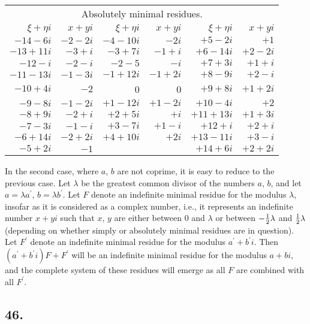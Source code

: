 \documentclass[twoside,12pt]{memoir}
\let\oldfrac\frac
\def\frac#1#2{\mathchoice{\tfrac{#1}{#2}}{\oldfrac{#1}{#2}}{\genfrac{}{}{}{2}{#1}{#2\mathstrut}}{\genfrac{}{}{}{3}{#1}{#2\mathstrut}}}
\begin{document}
\begin{center}
\begin{tabular}{r|r||r|r||r|r}
\multicolumn{6}{c}{Absolutely minimal residues.}\\
\(\xi+\eta i\) & \(x+yi\) & \(\xi+\eta i\) & \(x+yi\) & \(\xi+\eta i\) & \(x+yi\) \\
\hline
\(-14-6i\) & \(-2-2i\) & \(-4-10i\) & \(-2i\) & \(+5-2i\) & \(+1\) \\
\(-13+11i\) & \(-3+i\) & \(-3+7i\) & \(-1+i\) & \(+6-14i\) & \(+2-2i\) \\
\(-12-i\) & \(-2-i\) & \(-2-5\) & \(-i\) & \(+7+3i\) & \(+1+i\) \\
\(-11-13i\) & \(-1-3i\) & \(-1+12i\) & \(-1+2i\) & \(+8-9i\) & \(+2-i\) \\
\(-10+4i\) & \(-2\) & 0 & 0 & \(+9+8i\) & \(+1+2i\) \\
\(-9-8i\) & \(-1-2i\) & \(+1-12i\) & \(+1-2i\) & \(+10-4i\) & \(+2\) \\
\(-8+9i\) & \(-2+i\) & \(+2+5i\) & \(+i\) & \(+11+13i\) & \(+1+3i\) \\
\(-7-3i\) & \(-1-i\) & \(+3-7i\) & \(+1-i\) & \(+12+i\) & \(+2+i\) \\
\(-6+14i\) & \(-2+2i\) & \(+4+10i\) & \(+2i\) & \(+13-11i\) & \(+3-i\) \\
\(-5+2i\) & \(-1\) &\multicolumn{2}{c||}{} & \(+14+6i\) & \(+2+2i\) \\
\end{tabular}
\end{center}

In the second case, where \(a\), \(b\) are not coprime, it is easy to reduce to the previous case. Let \(\lambda\) be the greatest common divisor of the numbers \(a\), \(b\), and let \(a=\lambda a^{\prime}\), \(b=\lambda b^{\prime}\). Let \(F\) denote an indefinite minimal residue for the modulus \(\lambda\), insofar as it is considered as a complex number, i.e., it represents an indefinite number \(x+yi\) such that \(x\), \(y\) are either between \(0\) and \(\lambda\) or between \(-\frac{1}{2}\lambda\) and \(\frac{1}{2}\lambda\) (depending on whether simply or absolutely minimal residues are in question). Let \(F^{\prime}\) denote an indefinite minimal residue for the modulus \(a^{\prime}+b^{\prime}i\). Then \((a^{\prime}+b^{\prime}i)F+F^{\prime}\) will be an indefinite minimal residue for the modulus \(a+bi\), and the complete system of these residues will emerge as all \(F\) are combined with all \(F^{\prime}\).

\subsection*{46.}
\end{document}
